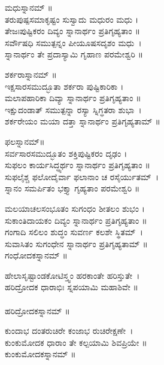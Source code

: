 ಮಧುಸ್ನಾನಮ್ ॥\\
ತರುಪುಷ್ಪಸಮಾಕೃಷ್ಟಂ ಸುಸ್ವಾದು ಮಧುರಂ ಮಧು ।\\
ತೇಜಃಪುಷ್ಟಿಕರಂ ದಿವ್ಯಂ ಸ್ನಾನಾರ್ಥಂ ಪ್ರತಿಗೃಹ್ಯತಾಂ ॥ \\
ಸರ್ವೌಷಧಿ ಸಮುತ್ಪನ್ನಂ ಪೀಯೂಷಸದೃಶಂ ಮಧು~।\\ ಸ್ನಾನಾರ್ಥಂ ತೇ ಪ್ರದಾಸ್ಯಾಮಿ ಗೃಹಾಣ ಪರಮೇಶ್ವರಿ ॥\\

ಶರ್ಕರಾಸ್ನಾನಮ್ ॥\\
ಇಕ್ಷಸಾರಸಮುದ್ಭೂತಾ ಶರ್ಕರಾ ಪುಷ್ಟಿಕಾರಿಕಾ ।\\
ಮಲಾಪಹಾರಿಕಾ ದಿವ್ಯಾ ಸ್ನಾನಾರ್ಥಂ ಪ್ರತಿಗೃಹ್ಯತಾಂ ॥\\
ಇಕ್ಷುದಂಡಾತ್ ಸಮುತ್ಪನ್ನಾ ರಸ್ಯಾ ಸ್ನಿಗ್ಧತರಾ ಶುಭಾ~।\\ಶರ್ಕರೇಯಂ ಮಯಾ ದತ್ತಾ ಸ್ನಾನಾರ್ಥಂ ಪ್ರತಿಗೃಹ್ಯತಾಮ್ ॥\\

 ಫಲಸ್ನಾನಮ್॥\\
ಸರ್ವಸಾರಸಮುದ್ಭೂತಂ ಶಕ್ತಿಪುಷ್ಟಿಕರಂ ದೃಢಂ ।\\
ಸುಫಲಂ ಕಾರ್ಯಸಿದ್ಧ್ಯರ್ಥಂ ಸ್ನಾನಾರ್ಥಂ ಪ್ರತಿಗೃಹ್ಯತಾಂ ॥\\
ಸುಫಲೈಶ್ಚ ಫಲೋದೈರ್ವಾ ಫಲಾನಾಂ ಚ ರಸೈರ್ಯುತಮ್~।\\ ಸ್ನಾನಂ ಸಮರ್ಪಿತಂ ಭಕ್ತ್ಯಾ ಗೃಹ್ಯತಾಂ ಪರಮೇಶ್ವರಿ ॥\\

ಮಲಯಾಚಲಸಂಭೂತಂ ಸುಗಂಧಂ ಶೀತಲಂ ಶುಭಂ ।\\
ಸುಕಾಂತಿದಾಯಕಂ ದಿವ್ಯಂ ಸ್ನಾನಾರ್ಥಂ ಪ್ರತಿಗೃಹ್ಯತಾಂ ॥\\
ಗಂಗಾದಿ ಸಲಿಲಂ ಶುದ್ಧಂ ಸುವರ್ಣ ಕಲಶೇ ಸ್ಥಿತಮ್~।\\ ಸುವಾಸಿತಂ ಸುಗಂಧೇನ ಸ್ನಾನಾರ್ಥಂ ಪ್ರತಿಗೃಹ್ಯತಾಮ್ ॥\\
 ಗಂಧೋದಕಸ್ನಾನಮ್ ॥

ಹೇಲಾಸೃಷ್ಟಾಂಡಕೋಟಿಸ್ತ್ವಂ ಹರಕಾಂತೇ ಹರಿಸ್ತುತೇ~।\\ ಹರಿದ್ರೋದಕ ಧಾರಾಭಿಃ ಸ್ನಪಯಾಮಿ ಮಹಾಶಿವೇ ॥\\
\\
 ಹರಿದ್ರೋದಕಸ್ನಾನಮ್ ॥

ಕುಂದಾಭ ದಂತರುಚಿರೇ ಕಂಜಾಭ ರುಚಿರೇಕ್ಷಣೇ~।\\ಕುಂಕುಮೋದಕ ಧಾರಾಂ ತೇ ಕಲ್ಪಯಾಮಿ ಶಿವಪ್ರಿಯೇ ॥\\
ಕುಂಕುಮೋದಕಸ್ನಾನಮ್ ॥


